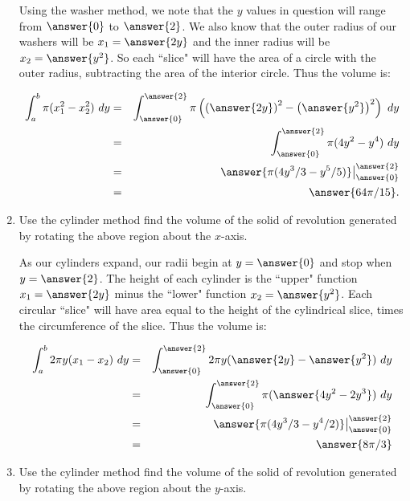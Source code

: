 \documentclass{ximera}
\begin{document}
\begin{question}
\begin{enumerate}
\begin{explanation}
Using the washer method, we note that the $y$ values in question will range from $\answer{0}$ to $\answer{2}$.  We also know that the outer radius of our washers will be $x_1=\answer{2y}$ and the inner radius will be $x_2=\answer{y^2}$.  So each ``slice" will have the area of a circle with the outer radius, subtracting the area of the interior circle.  Thus the volume is:

\begin{eqnarray*}
\int_a^b \pi(x_1^2-x_2^2)\ dy&=&\int_{\answer{0}}^{\answer{2}} \pi\left(   \left( \answer{2y}\right)^2  - \left( \answer{y^2}\right)^2   \right)\ dy\\
&=&\int_{\answer{0}}^{\answer{2}} \pi(4y^2-y^4)\ dy\\
&=&\answer{\pi(4y^3/3-y^5/5)}\big|_{\answer{0}}^{\answer{2}}\\
&=&\answer{64\pi/15}.
\end{eqnarray*}
\end{explanation}



\item Use the cylinder method find the volume of the solid of revolution generated by rotating the above region about the $x$-axis.

\begin{explanation}
As our cylinders expand, our radii begin at $y=\answer{0}$ and stop when $y=\answer{2}$.  The height of each cylinder is the ``upper" function $x_1=\answer{2y}$ minus the ``lower" function $x_2=\answer{y^2}$.  Each circular ``slice" will have area equal to the height of the cylindrical slice, times the circumference of the slice.  Thus the volume is:

\begin{eqnarray*}
\int_a^b 2\pi y(x_1-x_2)\ dy&=&\int_{\answer{0}}^{\answer{2}}2\pi y(\answer{2y}-\answer{y^2})\ dy\\
&=&\int_{\answer{0}}^{\answer{2}}\pi (\answer{4y^2-2y^3})\ dy\\
&=&\answer{\pi(4y^3/3-y^4/2)}\big|_{\answer{0}}^{\answer{2}}\\
&=&\answer{8\pi/3}
\end{eqnarray*}


\end{explanation}


\item Use the cylinder method find the volume of the solid of revolution generated by rotating the above region about the $y$-axis.


\end{enumerate}
\end{question}
\end{document}
